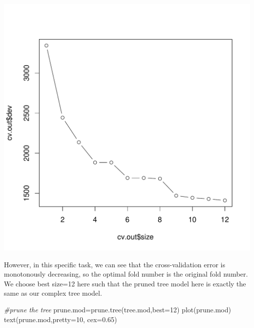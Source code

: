 \documentclass[
  11pt,
]{article}
\newenvironment{Shaded}{\begin{snugshade}}{\end{snugshade}}
\newcommand{\AttributeTok}[1]{\textcolor[rgb]{0.77,0.63,0.00}{#1}}
\newcommand{\CommentTok}[1]{\textcolor[rgb]{0.56,0.35,0.01}{\textit{#1}}}
\newcommand{\DecValTok}[1]{\textcolor[rgb]{0.00,0.00,0.81}{#1}}
\newcommand{\FloatTok}[1]{\textcolor[rgb]{0.00,0.00,0.81}{#1}}
\newcommand{\FunctionTok}[1]{\textcolor[rgb]{0.00,0.00,0.00}{#1}}
\newcommand{\NormalTok}[1]{#1}
\newcommand{\OtherTok}[1]{\textcolor[rgb]{0.56,0.35,0.01}{#1}}
\newcommand{\SpecialCharTok}[1]{\textcolor[rgb]{0.00,0.00,0.00}{#1}}
\newcommand{\StringTok}[1]{\textcolor[rgb]{0.31,0.60,0.02}{#1}}
\begin{document}
\begin{Shaded}
\end{Shaded}

\includegraphics[width=0.9\linewidth]{report_files/figure-latex/Task_2_4-1}

However, in this specific task, we can see that the cross-validation error is monotonously decreasing, so the optimal fold number is the original fold number. We choose best size=12 here such that the pruned tree model here is exactly the same as our complex tree model.

\begin{Shaded}
\begin{Highlighting}[]
\CommentTok{\#prune the tree}
\NormalTok{prune.mod}\OtherTok{=}\FunctionTok{prune.tree}\NormalTok{(tree.mod,}\AttributeTok{best=}\DecValTok{12}\NormalTok{)}
\FunctionTok{plot}\NormalTok{(prune.mod)}
\FunctionTok{text}\NormalTok{(prune.mod,}\AttributeTok{pretty=}\DecValTok{10}\NormalTok{, }\AttributeTok{cex=}\FloatTok{0.65}\NormalTok{)}
\end{Highlighting}
\end{Shaded}
\end{document}

